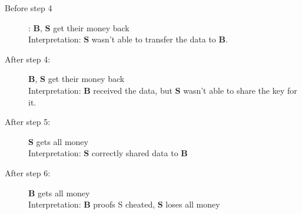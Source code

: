 \documentclass[a4paper]{article}
\newcommand{\Party}[1]{\mathbf{#1}}
\begin{document}
\begin{description}
\item[Before step 4]: $\Party{B}$, $\Party{S}$ get their money back\\
   Interpretation: $\Party{S}$ wasn't able to transfer the data to $\Party{B}$.

\item[After step 4:] $\Party{B}$, $\Party{S}$ get their money back\\
   Interpretation: $\Party{B}$ received the data, but $\Party{S}$ wasn't able to share the key for it.

\item[After step 5:] $\Party{S}$ gets all money\\
   Interpretation: $\Party{S}$ correctly shared data to $\Party{B}$

\item[After step 6:]$\Party{B}$ gets all money\\
  Interpretation: $\Party{B}$ proofs S cheated, $\Party{S}$ loses all money
\end{description}
\end{document}
